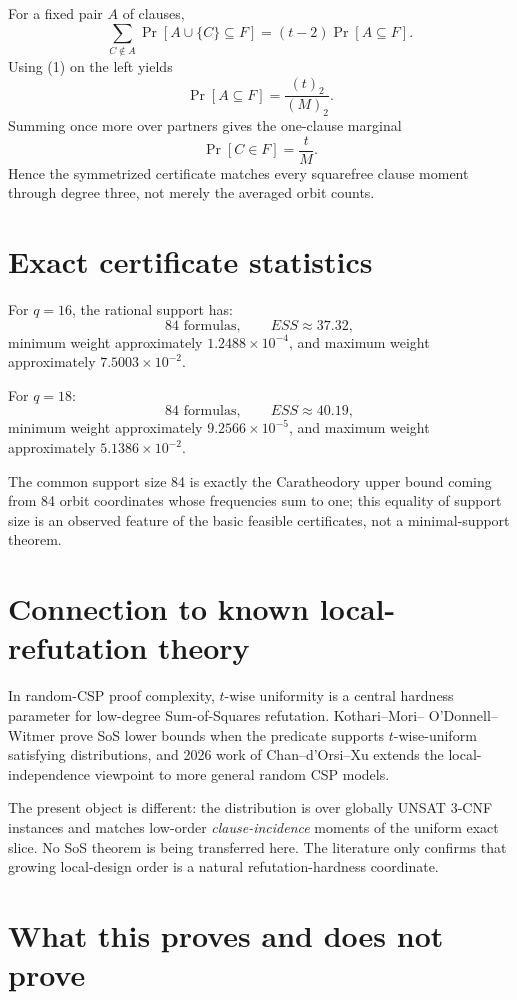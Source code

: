 \documentclass[11pt]{article}
\begin{document}
For a fixed pair \(A\) of clauses,
\[
\sum_{C\notin A}
\Pr[A\cup\{C\}\subseteq F]
=
(t-2)\Pr[A\subseteq F].
\]
Using (1) on the left yields
\[
\Pr[A\subseteq F]
=
\frac{(t)_2}{(M)_2}.
\]
Summing once more over partners gives the one-clause marginal
\[
\Pr[C\in F]=\frac tM.
\]
Hence the symmetrized certificate matches every squarefree clause moment
through degree three, not merely the averaged orbit counts.

\section{Exact certificate statistics}

For \(q=16\), the rational support has:
\[
84\text{ formulas},\qquad
ESS\approx37.32,
\]
minimum weight approximately \(1.2488\times10^{-4}\), and maximum weight
approximately \(7.5003\times10^{-2}\).

For \(q=18\):
\[
84\text{ formulas},\qquad
ESS\approx40.19,
\]
minimum weight approximately \(9.2566\times10^{-5}\), and maximum weight
approximately \(5.1386\times10^{-2}\).

The common support size 84 is exactly the Caratheodory upper bound coming
from 84 orbit coordinates whose frequencies sum to one; this equality of
support size is an observed feature of the basic feasible certificates, not a
minimal-support theorem.

\section{Connection to known local-refutation theory}

In random-CSP proof complexity, \(t\)-wise uniformity is a central hardness
parameter for low-degree Sum-of-Squares refutation.  Kothari--Mori--
O'Donnell--Witmer prove SoS lower bounds when the predicate supports
\(t\)-wise-uniform satisfying distributions, and 2026 work of
Chan--d'Orsi--Xu extends the local-independence viewpoint to more general
random CSP models.

The present object is different: the distribution is over globally UNSAT
3-CNF instances and matches low-order \emph{clause-incidence} moments of the
uniform exact slice.  No SoS theorem is being transferred here.  The
literature only confirms that growing local-design order is a natural
refutation-hardness coordinate.

\section{What this proves and does not prove}
\end{document}
